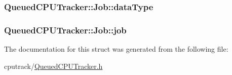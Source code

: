 \subsubsection[{\texorpdfstring{data\+Type}{dataType}}]{ Queued\+C\+P\+U\+Tracker\+::\+Job\+::data\+Type}\hypertarget{struct_queued_c_p_u_tracker_1_1_job_a157a2f8c4d4c9d9cc1ae4c5e3d509fb6}{}\label{struct_queued_c_p_u_tracker_1_1_job_a157a2f8c4d4c9d9cc1ae4c5e3d509fb6}
\subsubsection[{\texorpdfstring{job}{job}}]{ Queued\+C\+P\+U\+Tracker\+::\+Job\+::job}\hypertarget{struct_queued_c_p_u_tracker_1_1_job_a39a2b1088501b80d12ff323981ec7bad}{}\label{struct_queued_c_p_u_tracker_1_1_job_a39a2b1088501b80d12ff323981ec7bad}


The documentation for this struct was generated from the following file\+:\begin{DoxyCompactItemize}
\item 
cputrack/\hyperlink{_queued_c_p_u_tracker_8h}{Queued\+C\+P\+U\+Tracker.\+h}\end{DoxyCompactItemize}

